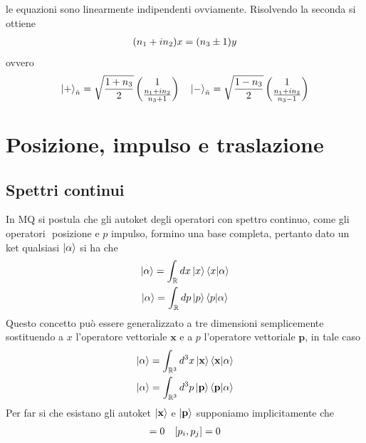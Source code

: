 \documentclass{article}
\begin{document}
le equazioni sono linearmente indipendenti ovviamente. Risolvendo la seconda si ottiene
\begin{gather}
    (n_1 + in_2)x = (n_3 \pm 1)y \notag
\end{gather}
ovvero
\begin{gather}
    \ket{+}_{\hat{n}} = \sqrt{\frac{1 + n_3}{2}}\begin{pmatrix}
        1 \\
        \frac{n_1 + in_2}{n_3 + 1}
    \end{pmatrix} \quad
    \ket{-}_{\hat{n}} = \sqrt{\frac{1 - n_3}{2}} \begin{pmatrix}
        1 \\
        \frac{n_1 + in_2}{n_3 - 1}
    \end{pmatrix} \notag
\end{gather}

\newpage
\section{Posizione, impulso e traslazione}

\subsection{Spettri continui}
In MQ si postula che gli autoket degli operatori con spettro continuo, come gli operatori $ $ posizione e $p$ impulso, formino una base completa, pertanto dato un ket qualsiasi $\ket{\alpha}$ si ha che
\begin{gather}
    \ket{\alpha} = \int_{\mathbb{R}} dx \ket{x}\braket{x|\alpha} \notag \\
    \ket{\alpha} = \int_{\mathbb{R}} dp \ket{p}\braket{p|\alpha} \notag
\end{gather}
Questo concetto può essere generalizzato a tre dimensioni semplicemente sostituendo a $x$ l'operatore vettoriale $\mathbf{x}$ e a $p$ l'operatore vettoriale $\mathbf{p}$, in tale caso
\begin{gather}
    \ket{\alpha} = \int_{\mathbb{R}^3} d^3x \ket{\mathbf{x}}\braket{\mathbf{x}|\alpha} \notag \\
    \ket{\alpha} = \int_{\mathbb{R}^3} d^3p \ket{\mathbf{p}}\braket{\mathbf{p}|\alpha} \notag
\end{gather}
Per far si che esistano gli autoket $\ket{\mathbf{x}}$ e $\ket{\mathbf{p}}$ supponiamo implicitamente che
\begin{gather}
    [x_i, x_j] = 0 \quad [p_i, p_j] = 0 \notag
\end{gather}
\end{document}
